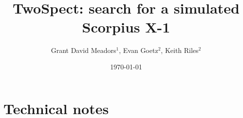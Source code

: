 \documentclass[12pt]{iopart}
\begin{document}
\title[TwoSpect: Scorpius X-1]{TwoSpect: search for a simulated Scorpius X-1}

\author{Grant David Meadors$^1$, Evan Goetz$^2$, Keith Riles$^2$}

\address{$^1$Max-Planck-Institut f\"{u}r Gravitationsphysik, Am M\"{u}hlenberg 1, 14476 Potsdam and Callinstra{\ss}e 38, 30167 Hannover, Germany}
\address{$^2$University of Michigan, 450 Church Street, Ann Arbor, Michigan 48109, USA}
\vspace{10pt}
\date{\today}

\section{Technical notes}
\end{document}
